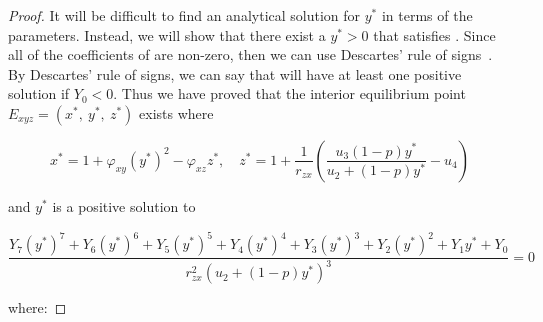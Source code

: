 \begin{proof}
    It will be difficult to find an analytical solution for $y^*$ in terms of the parameters. Instead, we will show that there exist a $y^*>0$ that satisfies . Since all of the coefficients of  are non-zero, then we can use Descartes' rule of signs~\cite{WANG2004525526}. By Descartes' rule of signs, we can say that  will have at least one positive solution if $Y_0<0$. Thus we have proved that the interior equilibrium point $E_{xyz}=\left(x^*,\ y^*,\ z^*\right)$ exists where
    
    \begin{equation*}
        x^*=1+\varphi_{xy}\left(y^*\right)^2-\varphi_{xz}z^*,\quad 
        z^*=1+\frac{1}{r_{zx}}\left(\frac{u_3\left(1-p\right)y^*}{u_2+\left(1-p\right)y^*}-u_4\right)
    \end{equation*}

    and $y^*$ is a positive solution to 

    \begin{equation*}
        \frac{Y_7\left(y^*\right)^7+Y_6\left(y^*\right)^6+Y_5\left(y^*\right)^5+Y_4\left(y^*\right)^4+Y_3\left(y^*\right)^3+Y_2\left(y^*\right)^2+Y_1y^*+Y_0}{r_{zx}^2\left(u_2+\left(1-p\right)y^*\right)^3}=0
    \end{equation*}

    where:


\end{proof}
